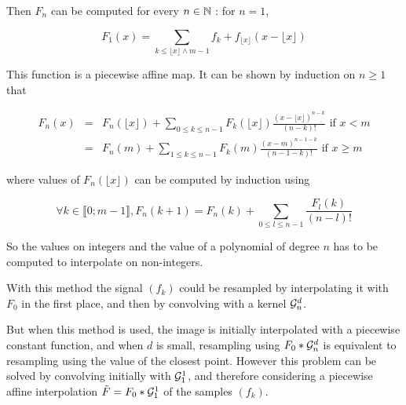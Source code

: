 \noindent Then $F_{n}$ can be computed for every $n\in\mathbb{N}$ : for $n=1$,

\begin{equation*}
F_{1}(x)=\underset{k\le \lfloor x\rfloor \wedge m-1}{\sum}f_{k}+ f_{\lfloor x\rfloor}
(x-\lfloor x\rfloor)
\end{equation*}

\noindent This function is a piecewise affine map. It can be shown by induction on $n\geq 1$ that

\begin{eqnarray*}
F_{n}(x)
&=&
F_n(\lfloor x\rfloor) + \displaystyle{\sum_{0 \leq k \leq n-1}}F_{k}(\lfloor x \rfloor) \frac{(x-\lfloor x \rfloor)^{n-k}}{(n-k)!} \text{ if } x<m\\
&=&
F_{n}(m) + \displaystyle{\sum_{1 \leq k \leq n-1}} F_{k}(m) \frac{(x-m)^{n-1-k}}{(n-1-k)!} \text{ if } x \geq m
\end{eqnarray*}

\noindent where values of $F_n(\lfloor x\rfloor)$ can be computed by induction using

\begin{equation*}
\forall k \in \llbracket 0 ; m-1 \rrbracket, F_{n}(k+1)=F_{n}(k)+\underset{0\le l \leq n-1}{\sum} \frac{F_{l}(k)}{(n-l)!}
\end{equation*}






\noindent So the values on integers and the value of a polynomial of degree $n$ has to be computed to interpolate on non-integers.

\medbreak
With this method the signal $(f_k)$ could be resampled by interpolating it with $F_{0}$ in the first place, and then by convolving with a kernel $\mathcal{G}_n^d$.

\noindent But when this method is used, the image is initially interpolated with a piecewise constant function, and when $d$ is small, resampling using $F_{0}*\mathcal{G}_n^d$ is equivalent to resampling using the value of the closest point. However this problem can be solved by convolving initially with $\mathcal{G}_1^1$, and therefore considering a piecewise affine interpolation $\tilde F = F_0*\mathcal{G}_1^1$ of the samples $(f_k)$.

